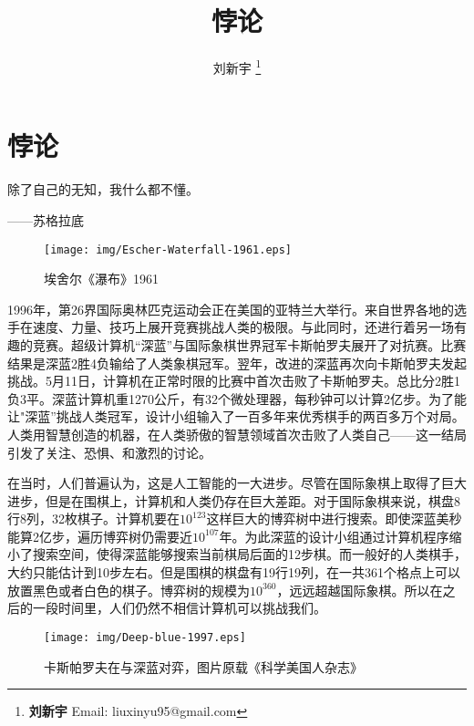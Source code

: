 \documentclass{article}
\begin{document}
\title{悖论}

\author{刘新宇
\thanks{{\bfseries 刘新宇} \newline
  Email: liuxinyu95@gmail.com \newline}
  }

\maketitle
\fi


\ifx\wholebook\relax
\chapter{悖论}
\fi

\epigraph{除了自己的无知，我什么都不懂。}{——苏格拉底}

\begin{wrapfigure}{R}{0.5\textwidth}
 \centering
 \texttt{[image: img/Escher-Waterfall-1961.eps]}
 \captionsetup{labelformat=empty}
 \caption{埃舍尔《瀑布》1961}
 \label{fig:Escher-Waterfall}
\end{wrapfigure}

1996年，第26界国际奥林匹克运动会正在美国的亚特兰大举行。来自世界各地的选手在速度、力量、技巧上展开竞赛挑战人类的极限。与此同时，还进行着另一场有趣的竞赛。超级计算机“深蓝”与国际象棋世界冠军卡斯帕罗夫展开了对抗赛。比赛结果是深蓝2胜4负输给了人类象棋冠军。翌年，改进的深蓝再次向卡斯帕罗夫发起挑战。5月11日，计算机在正常时限的比赛中首次击败了卡斯帕罗夫。总比分2胜1负3平。深蓝计算机重1270公斤，有32个微处理器，每秒钟可以计算2亿步。为了能让"深蓝”挑战人类冠军，设计小组输入了一百多年来优秀棋手的两百多万个对局。人类用智慧创造的机器，在人类骄傲的智慧领域首次击败了人类自己——这一结局引发了关注、恐惧、和激烈的讨论。

在当时，人们普遍认为，这是人工智能的一大进步。尽管在国际象棋上取得了巨大进步，但是在围棋上，计算机和人类仍存在巨大差距。对于国际象棋来说，棋盘8行8列，32枚棋子。计算机要在$10^{123}$这样巨大的博弈树中进行搜索。即使深蓝美秒能算2亿步，遍历博弈树仍需要近$10^{107}$年。为此深蓝的设计小组通过计算机程序缩小了搜索空间，使得深蓝能够搜索当前棋局后面的12步棋。而一般好的人类棋手，大约只能估计到10步左右。但是围棋的棋盘有19行19列，在一共361个格点上可以放置黑色或者白色的棋子。博弈树的规模为$10^{360}$，远远超越国际象棋。所以在之后的一段时间里，人们仍然不相信计算机可以挑战我们。

\begin{figure}[htbp]
 \centering
 \texttt{[image: img/Deep-blue-1997.eps]}
 \captionsetup{labelformat=empty}
 \caption{卡斯帕罗夫在与深蓝对弈，图片原载《科学美国人杂志》}
 \label{fig:Deep-blue-1997}
\end{figure}
\end{document}
